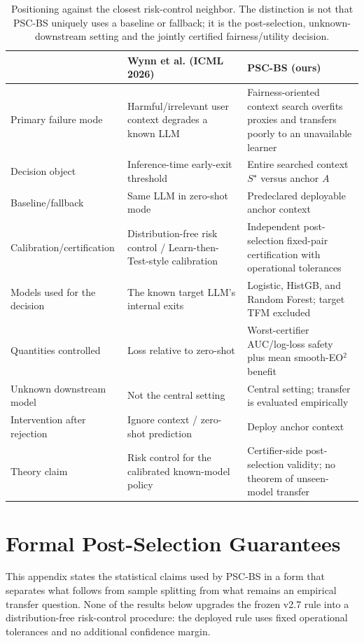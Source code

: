 \documentclass[10pt]{article}
\newcommand{\PSC}{\textsc{PSC-BS}}
\begin{document}
\begin{table}[h]
\centering
\caption{Positioning against the closest risk-control neighbor. The distinction is not that PSC-BS uniquely uses a baseline or fallback; it is the post-selection, unknown-downstream setting and the jointly certified fairness/utility decision.}
\label{tab:closest}
\small
\begin{tabular}{p{3.1cm}p{5.3cm}p{6.1cm}}
\toprule
 & Wynn et al. (ICML 2026) & PSC-BS (ours) \\
\midrule
Primary failure mode & Harmful/irrelevant user context degrades a known LLM & Fairness-oriented context search overfits proxies and transfers poorly to an unavailable learner \\
Decision object & Inference-time early-exit threshold & Entire searched context $S^\star$ versus anchor $A$ \\
Baseline/fallback & Same LLM in zero-shot mode & Predeclared deployable anchor context \\
Calibration/certification & Distribution-free risk control / Learn-then-Test-style calibration & Independent post-selection fixed-pair certification with operational tolerances \\
Models used for the decision & The known target LLM's internal exits & Logistic, HistGB, and Random Forest; target TFM excluded \\
Quantities controlled & Loss relative to zero-shot & Worst-certifier AUC/log-loss safety plus mean smooth-EO$^2$ benefit \\
Unknown downstream model & Not the central setting & Central setting; transfer is evaluated empirically \\
Intervention after rejection & Ignore context / zero-shot prediction & Deploy anchor context \\
Theory claim & Risk control for the calibrated known-model policy & Certifier-side post-selection validity; no theorem of unseen-model transfer \\
\bottomrule
\end{tabular}
\end{table}


\section{Formal Post-Selection Guarantees}
\label{app:formal}

This appendix states the statistical claims used by \PSC{} in a form that separates what follows from sample splitting from what remains an empirical transfer question. None of the results below upgrades the frozen v2.7 rule into a distribution-free risk-control procedure: the deployed rule uses fixed operational tolerances and no additional confidence margin.
\end{document}
